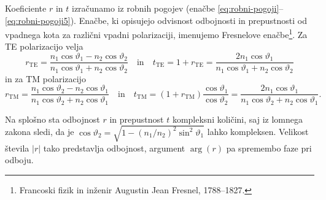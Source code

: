 Koeficiente $r$ in $t$ izračunamo iz robnih pogojev (enačbe 
\ref{eq:robni-pogoji}--\ref{eq:robni-pogoji5}). Enačbe, ki opisujejo odvisnost odbojnosti
in prepustnosti od vpadnega kota za različni vpadni polarizaciji, imenujemo
Fresnelove enačbe\footnote{Francoski fizik in inženir 
Augustin Jean Fresnel, 1788--1827.}. Za TE polarizacijo velja 
\begin{equation}
r_{\mathrm{TE}}=\frac{n_{1}\cos\vartheta_{1}-n_{2}\cos\vartheta_{2}}{n_{1}\cos\vartheta_{1}+
n_{2}\cos\vartheta_{2}}
\label{eq:Fresnel1} \quad \mathrm{in} \quad
t_{\mathrm{TE}}=1+r_{\mathrm{TE}}=\frac{2n_{1}\cos\vartheta_{1}}{n_{1}\cos\vartheta_{1}+
n_{2}\cos\vartheta_{2}}
\end{equation}
in za TM polarizacijo
\begin{equation}
r_{\mathrm{TM}}=\frac{n_{1}\cos\vartheta_{2}-n_{2}\cos\vartheta_{1}}{n_{1}\cos\vartheta_{2}+
n_{2}\cos\vartheta_{1}}
\quad \mathrm{in} \quad 
t_{\mathrm{TM}}=(1+r_{\mathrm{TM}})\frac{\cos\vartheta_{1}}{\cos\vartheta_{2}}=
\frac{2n_{1}\cos\vartheta_{1}}
{n_{1}\cos\vartheta_{2}+n_{2}\cos\vartheta_{1}}.
\label{eq:Fresnel2}
\end{equation}

Na splošno sta odbojnost $r$ in prepustnost $t$ kompleksni
količini, saj iz lomnega zakona sledi, da je $\cos\vartheta_{2}=
\sqrt{1-\left(n_{1}/n_{2}\right)^{2}\sin^{2}\vartheta_{1}}$
lahko kompleksen. Velikost števila $\left|r\right|$ tako predstavlja
odbojnost, argument $\arg(r)$ pa spremembo faze
pri odboju.

